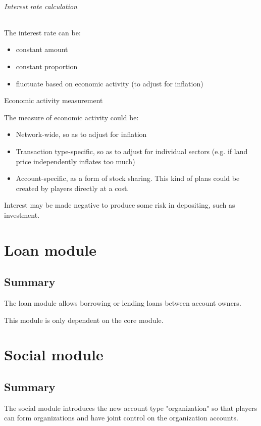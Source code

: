 \documentclass{report}
\begin{document}
				\paragraph{Interest rate calculation} The interest rate can be:
				\begin{itemize}
					\item constant amount
					\item constant proportion
					\item fluctuate based on economic activity (to adjust for inflation)
				\end{itemize}

					\subparagraph{Economic activity measurement} The measure of economic activity could be:
					\begin{itemize}
						\item Network-wide, so as to adjust for inflation
						\item Transaction type-specific, so as to adjust for individual sectors
							(e.g. if land price independently inflates too much)
						\item Account-specific, as a form of stock sharing.
							This kind of plans could be created by players directly at a cost.
					\end{itemize}

				Interest may be made negative to produce some risk in depositing, such as investment.

	\part{Loan module}
		\chapter{Summary}

			The loan module allows borrowing or lending loans between account owners.

			This module is only dependent on the core module.

	\part{Social module}
		\chapter{Summary}

			The social module introduces the new account type "organization" so that players can form organizations
			and have joint control on the organization accounts.
\end{document}
